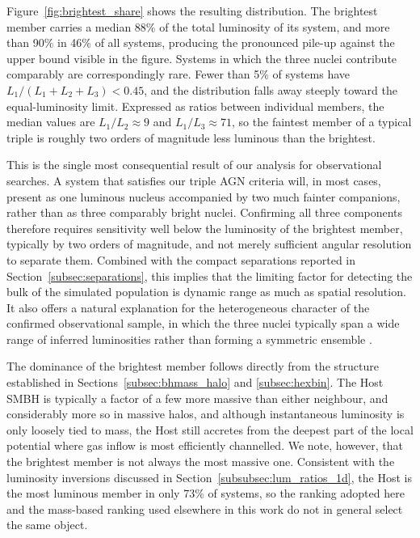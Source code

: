 \documentclass[twocolumn, 10pt]{article}
\begin{document}
Figure~\ref{fig:brightest_share} shows the resulting distribution. The brightest member carries a median 88\% of the total luminosity of its system, and more than 90\% in 46\% of all systems, producing the pronounced pile-up against the upper bound visible in the figure. Systems in which the three nuclei contribute comparably are correspondingly rare. Fewer than 5\% of systems have $L_1 / (L_1 + L_2 + L_3) < 0.45$, and the distribution falls away steeply toward the equal-luminosity limit. Expressed as ratios between individual members, the median values are $L_1 / L_2 \approx 9$ and $L_1 / L_3 \approx 71$, so the faintest member of a typical triple is roughly two orders of magnitude less luminous than the brightest.

This is the single most consequential result of our analysis for observational searches. A system that satisfies our triple AGN criteria will, in most cases, present as one luminous nucleus accompanied by two much fainter companions, rather than as three comparably bright nuclei. Confirming all three components therefore requires sensitivity well below the luminosity of the brightest member, typically by two orders of magnitude, and not merely sufficient angular resolution to separate them. Combined with the compact separations reported in Section~\ref{subsec:separations}, this implies that the limiting factor for detecting the bulk of the simulated population is dynamic range as much as spatial resolution. It also offers a natural explanation for the heterogeneous character of the confirmed observational sample, in which the three nuclei typically span a wide range of inferred luminosities rather than forming a symmetric ensemble \citep{Pfeifle2019}.

The dominance of the brightest member follows directly from the structure established in Sections~\ref{subsec:bhmass_halo} and \ref{subsec:hexbin}. The Host SMBH is typically a factor of a few more massive than either neighbour, and considerably more so in massive halos, and although instantaneous luminosity is only loosely tied to mass, the Host still accretes from the deepest part of the local potential where gas inflow is most efficiently channelled. We note, however, that the brightest member is not always the most massive one. Consistent with the luminosity inversions discussed in Section~\ref{subsubsec:lum_ratios_1d}, the Host is the most luminous member in only 73\% of systems, so the ranking adopted here and the mass-based ranking used elsewhere in this work do not in general select the same object.
\end{document}
